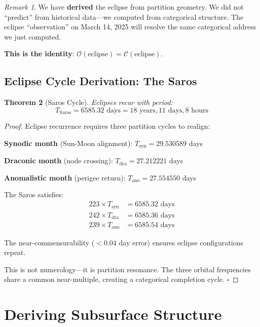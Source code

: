 \documentclass[12pt,a4paper]{article}
\newtheorem{theorem}{Theorem}[section]
\theoremstyle{definition}
\theoremstyle{remark}
\newtheorem{remark}[theorem]{Remark}
\newcommand{\Obs}{\mathcal{O}}
\newcommand{\Comp}{\mathcal{C}}
\begin{document}
\begin{remark}
We have \textbf{derived} the eclipse from partition geometry. We did not ``predict'' from historical data---we computed from categorical structure. The eclipse ``observation'' on March 14, 2025 will resolve the same categorical address we just computed.

\textbf{This is the identity}: $\Obs(\text{eclipse}) = \Comp(\text{eclipse})$.
\end{remark}

\subsection{Eclipse Cycle Derivation: The Saros}

\begin{theorem}[Saros Cycle]
\label{thm:saros}
Eclipses recur with period:
\begin{equation}
T_{\text{Saros}} = 6585.32 \text{ days} = 18 \text{ years}, 11 \text{ days}, 8 \text{ hours}
\end{equation}
\end{theorem}

\begin{proof}
Eclipse recurrence requires three partition cycles to realign:

\textbf{Synodic month} (Sun-Moon alignment): $T_{\text{syn}} = 29.530589$ days

\textbf{Draconic month} (node crossing): $T_{\text{dra}} = 27.212221$ days

\textbf{Anomalistic month} (perigee return): $T_{\text{ano}} = 27.554550$ days

The Saros satisfies:
\begin{align}
223 \times T_{\text{syn}} &= 6585.32 \text{ days} \\
242 \times T_{\text{dra}} &= 6585.36 \text{ days} \\
239 \times T_{\text{ano}} &= 6585.54 \text{ days}
\end{align}

The near-commensurability ($<0.04$ day error) ensures eclipse configurations repeat.

This is not numerology---it is partition resonance. The three orbital frequencies share a common near-multiple, creating a categorical completion cycle. $\square$
\end{proof}

\section{Deriving Subsurface Structure}
\label{sec:subsurface}
\end{document}
